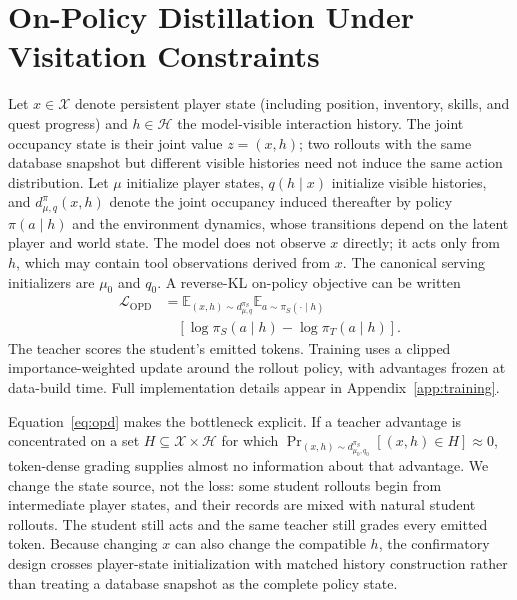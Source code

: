 \documentclass[11pt,a4paper]{article}
\begin{document}
\section{On-Policy Distillation Under Visitation Constraints}

Let $x\in\mathcal{X}$ denote persistent player state (including position,
inventory, skills, and quest progress) and
$h\in\mathcal{H}$ the model-visible interaction history. The joint occupancy state is
their joint value $z=(x,h)$; two rollouts with the same database snapshot but
different visible histories need not induce the same action distribution. Let
$\mu$ initialize player states, $q(h\mid x)$ initialize visible histories,
and $d^{\pi}_{\mu,q}(x,h)$ denote the joint occupancy induced thereafter by
policy $\pi(a\mid h)$ and the environment dynamics, whose transitions depend on
the latent player and world state. The model does not observe $x$ directly; it
acts only from $h$, which may contain tool observations derived from $x$. The canonical serving initializers
are $\mu_0$ and $q_0$. A reverse-KL on-policy objective can
be written
\begin{equation}
\begin{aligned}
\mathcal{L}_{\mathrm{OPD}}
&=\mathbb{E}_{(x,h)\sim d^{\pi_S}_{\mu,q}}
  \mathbb{E}_{a\sim\pi_S(\cdot\mid h)} \\
&\quad\left[\log\pi_S(a\mid h)-\log\pi_T(a\mid h)\right].
\end{aligned}
\label{eq:opd}
\end{equation}
The teacher scores the student's emitted tokens. Training uses a clipped
importance-weighted update around the rollout policy, with advantages frozen at
data-build time. Full implementation details appear in Appendix~\ref{app:training}.

Equation~\ref{eq:opd} makes the bottleneck explicit. If a teacher advantage is
concentrated on a set $H\subseteq\mathcal{X}\times\mathcal{H}$ for which
$\Pr_{(x,h)\sim d^{\pi_S}_{\mu_0,q_0}}[(x,h)\in H]\approx0$, token-dense grading supplies almost no
information about that advantage. We change the state source, not the loss:
some student rollouts begin from intermediate player states, and
their records are mixed with natural student rollouts. The student still acts
and the same teacher still grades every emitted token. Because changing $x$
can also change the compatible $h$, the confirmatory design crosses
player-state initialization with matched history construction rather than treating a
database snapshot as the complete policy state.
\end{document}
